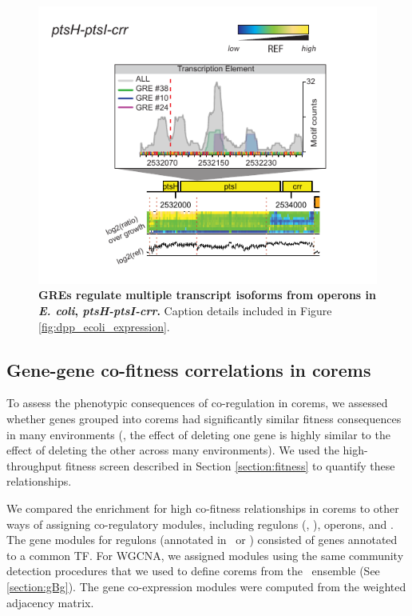 \begin{figure}[hp]
\centering
\includegraphics[width=0.7\linewidth]{figures/ptsh.pdf}
\caption[GREs regulate multiple transcript isoforms from operons in
  {\it E. coli}, \textit{ptsH-ptsI-crr}]{\textbf{GREs regulate
    multiple transcript isoforms from operons in {\it E. coli},
    \textit{ptsH-ptsI-crr}.} Caption details included in Figure
  \ref{fig:dpp_ecoli_expression}.}
\label{fig:ptsh}
\end{figure}

\subsection{Gene-gene co-fitness correlations in corems}

To assess the phenotypic consequences of co-regulation in corems, we assessed whether genes grouped into corems had significantly similar fitness consequences in many environments (\ie, the effect of deleting one gene is highly similar to the effect of deleting the other across many environments). We used the high-throughput fitness screen described in Section \ref{section:fitness} to quantify these relationships.

We compared the enrichment for high co-fitness relationships in corems to other ways of assigning co-regulatory modules, including regulons (, \rdb), operons, and . The gene modules for regulons (annotated in \rdb\ or  \cite{novichkov_regprecise_2012}) consisted of genes annotated to a common TF. For WGCNA, we assigned modules using the same community detection procedures that we used to define corems from the \egrine~ensemble (See \ref{section:gBg}). The gene co-expression modules were computed from the weighted  adjacency matrix.

